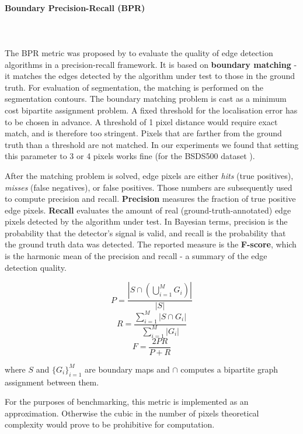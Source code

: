 \paragraph{Boundary Precision-Recall (BPR)}\mbox{}\\\mbox{}\\
\label{par:ch4-BPR-maths}
The BPR metric was proposed by \cite{Martin2004learning} %
to evaluate the quality of edge detection algorithms in a precision-recall framework. 
It is based on {\bf boundary matching} - it matches the edges detected by the algorithm under test to those in the ground truth. For evaluation of segmentation, the matching is performed on the segmentation contours. The boundary matching problem is cast as a minimum cost bipartite assignment problem. A fixed threshold for the localisation error has to be chosen in advance. A threshold of 1 pixel distance would require exact match, and is therefore too stringent. Pixels that are farther from the ground truth than a threshold are not matched. In our experiments we found that setting this parameter to 3 or 4 pixels works fine (for the BSDS500 dataset \cite{BSDS500resources}).

After the matching problem is solved, edge pixels are either {\it hits} (true positives), {\it misses} (false negatives), or false positives. Those numbers are subsequently used to compute precision and recall. 
{\bf Precision} measures the fraction of true positive edge pixels. {\bf Recall} evaluates the amount of real (\eg ground-truth-annotated) edge pixels detected by the algorithm under test. 
In Bayesian terms, precision is the probability that the detector's signal is valid, and recall is the probability that the ground truth data was detected. 
The reported measure is the \textbf{F-score}, which is the harmonic mean of the precision and recall - a summary of the edge detection quality.

\[
P=\frac{\left|S\cap\left(\bigcup\limits _{i=1}^{M}G_{i}\right)\right|}{|S|}
\]
\[
R=\frac{{\sum\limits _{i=1}^{M}\left|S\cap G_{i}\right|}}{\sum\limits _{i=1}^{M}\left|G_{i}\right|}
\]
\[
F=\frac{2PR}{P+R}
\]

where $S$ and $\{G_{i}\}_{i=1}^{M}$ are boundary maps and $\cap$
computes a bipartite graph assignment between them.

For the purposes of benchmarking, this metric is implemented as an approximation. Otherwise the cubic in the number of pixels %
theoretical complexity would prove to be prohibitive for computation.

